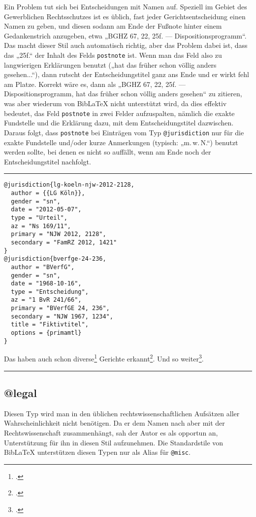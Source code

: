 \documentclass[11pt,a4paper,DIV=calc]{scrartcl}
\newcommand\software[1]{\textsf{#1}}
\newcommand\Biblatex{\software{Bib\LaTeX{}}\xspace}
\newenvironment{rubexample}{\par\vspace{\baselineskip}\hrule\par\begin{refsection}}{\end{refsection}\par\hrule\par\vspace{\baselineskip}}
\begin{document}
Ein Problem tut sich bei Entscheidungen mit Namen auf. Speziell im
Gebiet des Gewerblichen Rechtsschutzes ist es üblich, fast jeder
Gerichtsentscheidung einen Namen zu geben, und diesen sodann am Ende
der Fußnote hinter einem Gedankenstrich anzugeben, etwa „BGHZ 67, 22,
25f. — Dispositionsprogramm“. Das macht dieser Stil auch automatisch
richtig, aber das Problem dabei ist, dass das „25f.“ der Inhalt des
Felds \verb+postnote+ ist. Wenn man das Feld also zu langwierigen
Erklärungen benutzt („hat das früher schon völlig anders gesehen...“),
dann rutscht der Entscheidungstitel ganz ans Ende und er wirkt fehl am
Platze. Korrekt wäre es, dann als „BGHZ 67, 22, 25f. —
Dispositionsprogramm, hat das früher schon völlig anders gesehen“ zu
zitieren, was aber wiederum von \Biblatex{} nicht unterstützt wird, da
dies effektiv bedeutet, das Feld \verb+postnote+ in zwei Felder
aufzuspalten, nämlich die exakte Fundstelle und die Erklärung dazu,
mit dem Entscheidungstitel dazwischen. Daraus folgt, dass
\verb+postnote+ bei Einträgen vom Typ \verb+@jurisdiction+ nur für die
exakte Fundstelle und/oder kurze Anmerkungen (typisch: „m.\,w.\,N.“)
benutzt werden sollte, bei denen es nicht so auffällt, wenn am Ende
noch der Entscheidungstitel nachfolgt.

\begin{rubexample}
\begin{verbatim}
@jurisdiction{lg-koeln-njw-2012-2128,
  author = {{LG Köln}},
  gender = "sn",
  date = "2012-05-07",
  type = "Urteil",
  az = "Ns 169/11",
  primary = "NJW 2012, 2128",
  secondary = "FamRZ 2012, 1421"
}
@jurisdiction{bverfge-24-236,
  author = "BVerfG",
  gender = "sn",
  date = "1968-10-16",
  type = "Entscheidung",
  az = "1 BvR 241/66",
  primary = "BVerfGE 24, 236",
  secondary = "NJW 1967, 1234",
  title = "Fiktivtitel",
  options = {primamtl}
}
\end{verbatim}

Das haben auch schon diverse\footcite[2129]{lg-koeln-njw-2012-2128}
Gerichte erkannt\footcite{bverfge-24-236}. Und so weiter\footcite[240
m.\,w.\,N]{bverfge-24-236}.

\printbibliography
\end{rubexample}

\subsection{@legal}

Diesen Typ wird man in den üblichen rechtswissenschaftlichen Aufsätzen
aller Wahrscheinlichkeit nicht benötigen. Da er dem Namen nach aber
mit der Rechtswissenschaft zusammenhängt, sah der Autor es als
opportun an, Unterstützung für ihn in diesen Stil aufzunehmen. Die
Standardstile von \Biblatex unterstützen diesen Typen nur als Alias
für \verb+@misc+.
\end{document}
